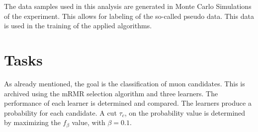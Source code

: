 The data samples used in this analysis are generated in Monte Carlo Simulations of the experiment. This allows for labeling of the so-called pseudo data. This data is used in the training of the applied algorithms.

\section{Tasks}
\label{sec:Tasks}

As already mentioned, the goal is the classification of muon candidates. This is archived using the mRMR selection algorithm and three learners. The performance of each learner is determined and compared. The learners produce a probability for each candidate. A cut $\tau_c$, on the probability value is determined by maximizing the $f_\beta$ value, with $\beta=0.1$. 
